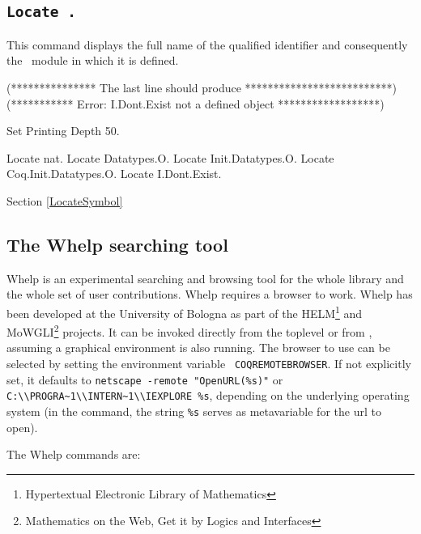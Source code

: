 
\subsection{\tt Locate {\qualid}.}
\label{Locate}
This command displays the full name of the qualified identifier {\qualid}
and consequently the \Coq\ module in which it is defined.

\begin{coq_eval}
(*************** The last line should produce **************************)
(*********** Error: I.Dont.Exist not a defined object ******************)
\end{coq_eval}
\begin{coq_eval}
Set Printing Depth 50.
\end{coq_eval}
\begin{coq_example}
Locate nat.
Locate Datatypes.O.
Locate Init.Datatypes.O.
Locate Coq.Init.Datatypes.O.
Locate I.Dont.Exist.
\end{coq_example}

\SeeAlso Section \ref{LocateSymbol}

\subsection{The {\sc Whelp} searching tool
\label{Whelp}}

{\sc Whelp} is an experimental searching and browsing tool for the
whole {\Coq} library and the whole set of {\Coq} user contributions.
{\sc Whelp} requires a browser to work. {\sc Whelp} has been developed
at the University of Bologna as part of the HELM\footnote{Hypertextual
Electronic Library of Mathematics} and MoWGLI\footnote{Mathematics on
the Web, Get it by Logics and Interfaces} projects.  It can be invoked
directly from the {\Coq} toplevel or from {\CoqIDE}, assuming a
graphical environment is also running. The browser to use can be
selected by setting the environment variable {\tt
COQREMOTEBROWSER}. If not explicitly set, it defaults to
\verb!netscape -remote "OpenURL(%s)"!  or
\verb!C:\\PROGRA~1\\INTERN~1\\IEXPLORE %s!, depending on the
underlying operating system (in the command, the string \verb!%s!
serves as metavariable for the url to open).

The {\sc Whelp} commands are:

